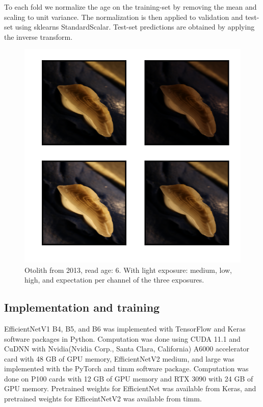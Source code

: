 \documentclass[10pt,letterpaper]{article}
\begin{document}
To each fold we normalize the age on the training-set by removing the mean and scaling to unit variance. The normalization is then applied to validation and test-set using sklearns StandardScalar. Test-set predictions are obtained by applying the inverse transform.

\begin{figure}[h!]
  \caption{Otolith from 2013, read age: 6. With light exposure: medium, low, high, 
  and expectation per channel of the three exposures. }
  \centering
  \includegraphics[scale=1.0]{otolith/2013_70174_Nr06_age09_IMG_0031_32_33.png}
  
  \label{marker2}
\end{figure}

\subsection*{Implementation and training}

EfficientNetV1 B4, B5, and B6 was implemented with  TensorFlow \citep{abadi2016tensorflow} and Keras \citep{keras} software packages in Python. Computation was done using CUDA 11.1 and CuDNN with Nvidia(Nvidia Corp., Santa Clara, California) A6000 accelerator card with 48 GB of GPU memory,
EfficientNetV2 medium, and large was implemented with the PyTorch \citep{NEURIPS2019_9015}  and timm \citep{rw2019timm} software package. Computation was done on P100 cards with 12 GB of GPU memory and RTX 3090 with 24 GB of GPU memory. Pretrained weights for EfficientNet was available from Keras, and pretrained weights for EfficeintNetV2 was available from timm.
\end{document}

